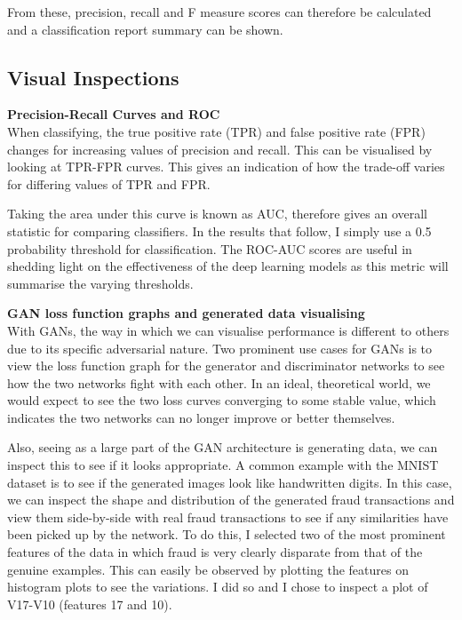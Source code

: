 \documentclass[12pt,a4paper,twoside]{report}
\begin{document}
From these, precision, recall and F measure scores can therefore be calculated and a classification report summary can be shown. 

\subsection{Visual Inspections}

\textbf{Precision-Recall Curves and ROC}\\
When classifying, the true positive rate (TPR) and false positive rate (FPR) changes for increasing values of precision and recall. This can be visualised by looking at TPR-FPR curves. This gives an indication of how the trade-off varies for differing values of TPR and FPR.

Taking the area under this curve is known as AUC, therefore gives an overall statistic for comparing classifiers. In the results that follow, I simply use a 0.5 probability threshold for classification. The ROC-AUC scores are useful in shedding light on the effectiveness of the deep learning models as this metric will summarise the varying thresholds.

\textbf{GAN loss function graphs and generated data visualising}\\
With GANs, the way in which we can visualise performance is different to others due to its specific adversarial nature. Two prominent use cases for GANs is to view the loss function graph for the generator and discriminator networks to see how the two networks fight with each other. In an ideal, theoretical world, we would expect to see the two loss curves converging to some stable value, which indicates the two networks can no longer improve or better themselves. 

Also, seeing as a large part of the GAN architecture is generating data, we can inspect this to see if it looks appropriate. A common example with the MNIST dataset is to see if the generated images look like handwritten digits. In this case, we can inspect the shape and distribution of the generated fraud transactions and view them side-by-side with real fraud transactions to see if any similarities have been picked up by the network. To do this, I selected two of the most prominent features of the data in which fraud is very clearly disparate from that of the genuine examples. This can easily be observed by plotting the features on histogram plots to see the variations. I did so and I chose to inspect a plot of V17-V10 (features 17 and 10).
\end{document}
